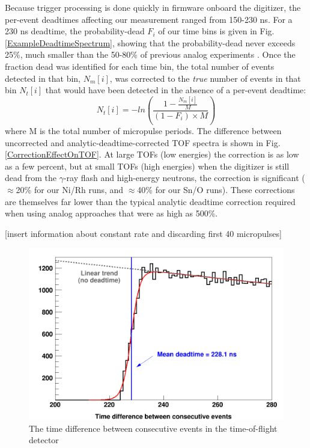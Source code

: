 Because trigger processing is done quickly in
firmware onboard the digitizer, the per-event deadtimes affecting our
measurement ranged from 150-230 ns. For a 230 ns deadtime, the probability-dead
$F_{i}$ of our time bins is given in Fig.
\ref{ExampleDeadtimeSpectrum}, showing that the probability-dead never exceeds
25\%, much smaller than the 50-80\% of previous analog experiments \cite{Finlay1993,
Abfalterer2001}.
Once the fraction dead was identified for each time bin, the total number of
events detected in that bin, $N_{m}[i]$, was corrected to the \textit{true}
number of events in that bin $N_{t}[i]$ that would have been detected in the
absence of a
per-event deadtime:
\begin{equation}
    N_{t}[i] = -ln\left(\frac{1-\frac{N_m[i]}{M}}{(1-F_{i})\times M}\right)
\end{equation}
where M is the total number of micropulse periods. The difference between
uncorrected and analytic-deadtime-corrected TOF spectra is shown in Fig.
\ref{CorrectionEffectOnTOF}. At large TOFs (low energies) the correction is as low as a
few percent, but at small TOFs (high energies) when the digitizer is still dead
from the $\gamma$-ray flash and high-energy neutrons, the correction is significant
($\approx$20\% for our Ni/Rh runs, and $\approx$40\% for our Sn/O runs). These 
corrections are themselves far lower than the typical
analytic deadtime correction required when using analog approaches \cite{Finlay1993,
Abfalterer2001} that were as high as 500\%.%

[insert information about constant rate and discarding first 40 micropulses]

\begin{figure}
    \includegraphics[scale=0.24]{figures/TimeDifferenceBetweenEvents.png}
    \caption{The time difference between consecutive events in the time-of-flight detector}
    \label{TimeDifferenceBetweenEvents}
\end{figure}

